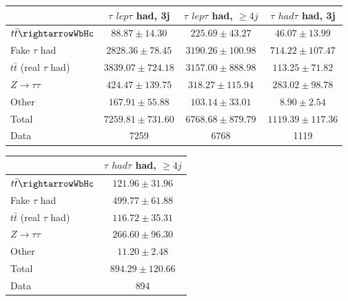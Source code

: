 \begin{table}
\begin{center}
  \begin{tabular}{ | l |  c |  c |  c | }
    \hline \hline 
     &  $\tau$ ${lep}\tau$ {had}, 3j  &  $\tau$ ${lep}\tau$ {had}, $\geq4j$  &  $\tau$ ${had}\tau$ {had}, 3j  \\ 
    \hline 
     $t\bar{t}\rightarrowWbHc$  &   $ 88.87 \pm 14.30 $ &   $ 225.69 \pm 43.27 $ &   $ 46.07 \pm 13.99 $ \\ 
     Fake $\tau$ {had}  &   $ 2828.36 \pm 78.45 $ &   $ 3190.26 \pm 100.98 $ &   $ 714.22 \pm 107.47 $ \\ 
     $t\bar{t}$ (real $\tau$ {had})  &   $ 3839.07 \pm 724.18 $ &   $ 3157.00 \pm 888.98 $ &   $ 113.25 \pm 71.82 $ \\ 
     $Z\rightarrow\tau\tau$  &   $ 424.47 \pm 139.75 $ &   $ 318.27 \pm 115.94 $ &   $ 283.02 \pm 98.78 $ \\ 
    Other  &   $ 167.91 \pm 55.88 $ &   $ 103.14 \pm 33.01 $ &   $ 8.90 \pm 2.54 $ \\ 
    Total  &   $ 7259.81 \pm 731.60 $ &   $ 6768.68 \pm 879.79 $ &   $ 1119.39 \pm 117.36 $ \\ 
    \hline 
    Data  & 7259  & 6768  & 1119  \\ 
    \hline \hline 
  \end{tabular} 


  \begin{tabular}{ | l |  c | }
    \hline \hline 
     &  $\tau$ ${had}\tau$ {had}, $\geq4j$  \\ 
    \hline 
     $t\bar{t}\rightarrowWbHc$  &   $ 121.96 \pm 31.96 $ \\ 
     Fake $\tau$ {had}  &   $ 499.77 \pm 61.88 $ \\ 
     $t\bar{t}$ (real $\tau$ {had})  &   $ 116.72 \pm 35.31 $ \\ 
     $Z\rightarrow\tau\tau$  &   $ 266.60 \pm 96.30 $ \\ 
    Other  &   $ 11.20 \pm 2.48 $ \\ 
    Total  &   $ 894.29 \pm 120.66 $ \\ 
    \hline 
    Data  & 894  \\ 
    \hline \hline 
  \end{tabular} 


\end{center}
\end{table}
